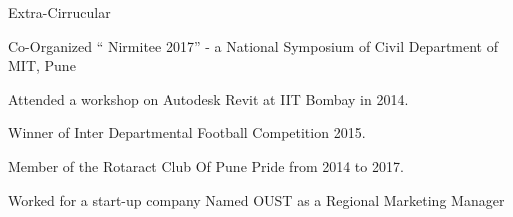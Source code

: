 \documentclass{resume} %
\begin{document}
\begin{rSection}{Extra-Cirrucular} \itemsep -3pt
\item Co-Organized “ Nirmitee 2017” - a National Symposium of Civil Department of MIT, Pune
\item Attended a workshop on Autodesk Revit at IIT Bombay in 2014.
\item Winner of Inter Departmental Football Competition 2015.
\item Member of the  Rotaract Club Of Pune Pride from 2014 to 2017.
\item Worked for a start-up company Named OUST as a Regional Marketing Manager
\end{rSection}
\end{document}
